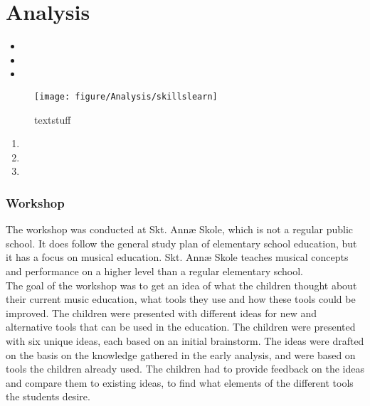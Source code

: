 \chapter{Analysis}\label{chap:analysis}
 
\begin{quote}
\end{quote}


\begin{itemize}\label{stuff}
	\item 
	\item 
	\item
\end{itemize}

\begin{figure}[H]
	\centering
	\texttt{[image: figure/Analysis/skillslearn]}
	\caption{textstuff}
	\label{fig:activelearn}
\end{figure}

\begin{enumerate}
	\item 
	\item
	\item
\end{enumerate}

\subsection{Workshop}\label{sec:workshop}
The workshop was conducted at Skt. Annæ Skole, which is not a regular public school. It does follow the general study plan of elementary school education, but it has a focus on musical education. Skt. Annæ Skole teaches musical concepts and performance on a higher level than a regular elementary school.\\

The goal of the workshop was to get an idea of what the children thought about their current music education, what tools they use and how these tools could be improved. The children were presented with different ideas for new and alternative tools that can be used in the education. The children were presented with six unique ideas, each based on an initial brainstorm. The ideas were drafted on the basis on the knowledge gathered in the early analysis, and were based on tools the children already used. The children had to provide feedback on the ideas and compare them to existing ideas, to find what elements of the different tools the students desire.\\

